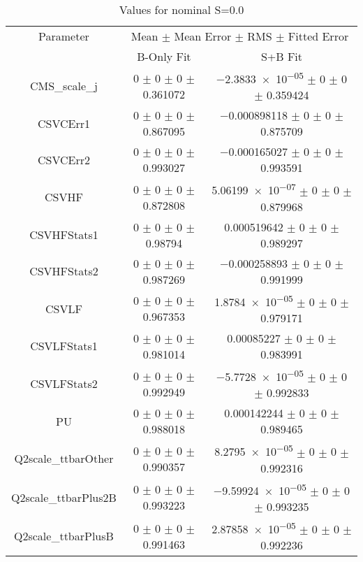 \begin{table}
\centering
\caption{Values for nominal S=0.0}
\begin{tabular}{ccc}
\toprule
Parameter & \multicolumn{2}{c}{Mean $\pm$ Mean Error $\pm$ RMS $\pm$ Fitted Error}\\
 & B-Only Fit & S+B Fit\\
\midrule
CMS\_scale\_j & \num{0} $\pm$ \num{0} $\pm$ \num{0} $\pm$ \num{0.361072} & \num{-2.3833e-05} $\pm$ \num{0} $\pm$ \num{0} $\pm$ \num{0.359424}\\
CSVCErr1 & \num{0} $\pm$ \num{0} $\pm$ \num{0} $\pm$ \num{0.867095} & \num{-0.000898118} $\pm$ \num{0} $\pm$ \num{0} $\pm$ \num{0.875709}\\
CSVCErr2 & \num{0} $\pm$ \num{0} $\pm$ \num{0} $\pm$ \num{0.993027} & \num{-0.000165027} $\pm$ \num{0} $\pm$ \num{0} $\pm$ \num{0.993591}\\
CSVHF & \num{0} $\pm$ \num{0} $\pm$ \num{0} $\pm$ \num{0.872808} & \num{5.06199e-07} $\pm$ \num{0} $\pm$ \num{0} $\pm$ \num{0.879968}\\
CSVHFStats1 & \num{0} $\pm$ \num{0} $\pm$ \num{0} $\pm$ \num{0.98794} & \num{0.000519642} $\pm$ \num{0} $\pm$ \num{0} $\pm$ \num{0.989297}\\
CSVHFStats2 & \num{0} $\pm$ \num{0} $\pm$ \num{0} $\pm$ \num{0.987269} & \num{-0.000258893} $\pm$ \num{0} $\pm$ \num{0} $\pm$ \num{0.991999}\\
CSVLF & \num{0} $\pm$ \num{0} $\pm$ \num{0} $\pm$ \num{0.967353} & \num{1.8784e-05} $\pm$ \num{0} $\pm$ \num{0} $\pm$ \num{0.979171}\\
CSVLFStats1 & \num{0} $\pm$ \num{0} $\pm$ \num{0} $\pm$ \num{0.981014} & \num{0.00085227} $\pm$ \num{0} $\pm$ \num{0} $\pm$ \num{0.983991}\\
CSVLFStats2 & \num{0} $\pm$ \num{0} $\pm$ \num{0} $\pm$ \num{0.992949} & \num{-5.7728e-05} $\pm$ \num{0} $\pm$ \num{0} $\pm$ \num{0.992833}\\
PU & \num{0} $\pm$ \num{0} $\pm$ \num{0} $\pm$ \num{0.988018} & \num{0.000142244} $\pm$ \num{0} $\pm$ \num{0} $\pm$ \num{0.989465}\\
Q2scale\_ttbarOther & \num{0} $\pm$ \num{0} $\pm$ \num{0} $\pm$ \num{0.990357} & \num{8.2795e-05} $\pm$ \num{0} $\pm$ \num{0} $\pm$ \num{0.992316}\\
Q2scale\_ttbarPlus2B & \num{0} $\pm$ \num{0} $\pm$ \num{0} $\pm$ \num{0.993223} & \num{-9.59924e-05} $\pm$ \num{0} $\pm$ \num{0} $\pm$ \num{0.993235}\\
Q2scale\_ttbarPlusB & \num{0} $\pm$ \num{0} $\pm$ \num{0} $\pm$ \num{0.991463} & \num{2.87858e-05} $\pm$ \num{0} $\pm$ \num{0} $\pm$ \num{0.992236}\\

\end{tabular}
\end{table}
